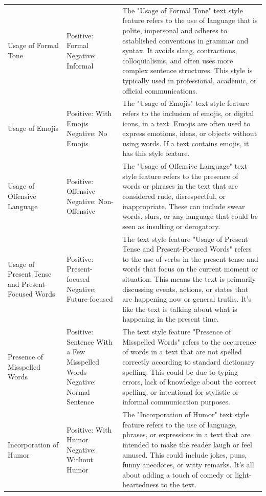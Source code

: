 {{\begin{longtable}{p{4cm} p{4cm} p{6.5cm}}
Usage of Formal Tone & Positive: Formal \newline Negative: Informal & The "Usage of Formal Tone" text style feature refers to the use of language that is polite, impersonal and adheres to established conventions in grammar and syntax. It avoids slang, contractions, colloquialisms, and often uses more complex sentence structures. This style is typically used in professional, academic, or official communications. \\
Usage of Emojis & Positive: With Emojis \newline Negative: No Emojis & The "Usage of Emojis" text style feature refers to the inclusion of emojis, or digital icons, in a text. Emojis are often used to express emotions, ideas, or objects without using words. If a text contains emojis, it has this style feature. \\
Usage of Offensive Language & Positive: Offensive \newline Negative: Non-Offensive & The "Usage of Offensive Language" text style feature refers to the presence of words or phrases in the text that are considered rude, disrespectful, or inappropriate. These can include swear words, slurs, or any language that could be seen as insulting or derogatory. \\
Usage of Present Tense and Present-Focused Words & Positive: Present-focused \newline Negative: Future-focused & The text style feature "Usage of Present Tense and Present-Focused Words" refers to the use of verbs in the present tense and words that focus on the current moment or situation. This means the text is primarily discussing events, actions, or states that are happening now or general truths. It's like the text is talking about what is happening in the present time. \\
Presence of Misspelled Words & Positive: Sentence With a Few Misspelled Words \newline Negative: Normal Sentence & The text style feature "Presence of Misspelled Words" refers to the occurrence of words in a text that are not spelled correctly according to standard dictionary spelling. This could be due to typing errors, lack of knowledge about the correct spelling, or intentional for stylistic or informal communication purposes. \\
Incorporation of Humor & Positive: With Humor \newline Negative: Without Humor & The "Incorporation of Humor" text style feature refers to the use of language, phrases, or expressions in a text that are intended to make the reader laugh or feel amused. This could include jokes, puns, funny anecdotes, or witty remarks. It's all about adding a touch of comedy or light-heartedness to the text. \\

\end{longtable}}}
